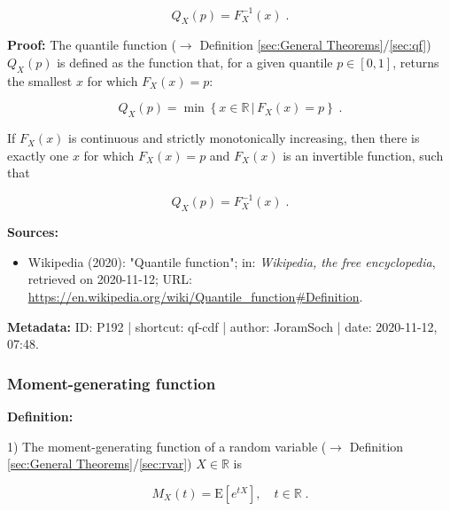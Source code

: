 \documentclass[a4paper,12pt,twoside]{book}
\begin{document}
\begin{equation} \label{eq:qf-cdf-qf-cdf}
Q_X(p) = F_X^{-1}(x) \; .
\end{equation}


\vspace{1em}
\textbf{Proof:} The quantile function ($\rightarrow$ Definition \ref{sec:General Theorems}/\ref{sec:qf}) $Q_X(p)$ is defined as the function that, for a given quantile $p \in [0,1]$, returns the smallest $x$ for which $F_X(x) = p$:

\begin{equation} \label{eq:qf-cdf-qf}
Q_X(p) = \min \left\lbrace x \in \mathbb{R} \, \vert \, F_X(x) = p \right\rbrace \; .
\end{equation}

If $F_X(x)$ is continuous and strictly monotonically increasing, then there is exactly one $x$ for which $F_X(x) = p$ and $F_X(x)$ is an invertible function, such that

\begin{equation} \label{eq:qf-cdf-qf-cdf-qed}
Q_X(p) = F_X^{-1}(x) \; .
\end{equation}


\vspace{1em}
\textbf{Sources:}
\begin{itemize}
\item Wikipedia (2020): "Quantile function"; in: \textit{Wikipedia, the free encyclopedia}, retrieved on 2020-11-12; URL: \url{https://en.wikipedia.org/wiki/Quantile_function#Definition}.
\end{itemize}


\vspace{1em}
\textbf{Metadata:} ID: P192 | shortcut: qf-cdf | author: JoramSoch | date: 2020-11-12, 07:48.
\vspace{1em}



\subsubsection[\textit{Moment-generating function}]{Moment-generating function} \label{sec:mgf}
\setcounter{equation}{0}

\textbf{Definition:}

1) The moment-generating function of a random variable ($\rightarrow$ Definition \ref{sec:General Theorems}/\ref{sec:rvar}) $X \in \mathbb{R}$ is

\begin{equation} \label{eq:mgf-mgf-var}
M_X(t) = \mathrm{E} \left[ e^{tX} \right], \quad t \in \mathbb{R} \; .
\end{equation}
\end{document}
